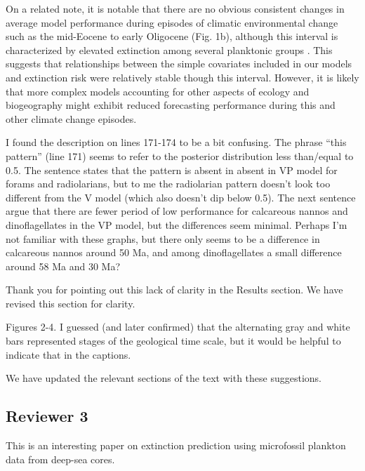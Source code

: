 \documentclass[12pt,letterpaper]{article}
\begin{document}
\begin{refsection}
On a related note, it is notable that there are no obvious consistent changes in average model performance during episodes of climatic environmental change such as the mid-Eocene to early Oligocene (Fig. 1b), although this interval is characterized by elevated extinction among several planktonic groups \citep{Prothero1994,Wade2008,Kamikuri2012}. This suggests that relationships between the simple covariates included in our models and extinction risk were relatively stable though this interval.  However, it is likely that more complex models accounting for other aspects of ecology and biogeography might exhibit reduced forecasting performance during this and other climate change episodes.

\begin{bfseries}
  I found the description on lines 171-174 to be a bit confusing. The phrase “this pattern” (line 171) seems to refer to the posterior distribution less than/equal to 0.5. The sentence states that the pattern is absent in absent in VP model for forams and radiolarians, but to me the radiolarian pattern doesn’t look too different from the V model (which also doesn’t dip below 0.5). The next sentence argue that there are fewer period of low performance for calcareous nannos and dinoflagellates in the VP model, but the differences seem minimal. Perhaps I’m not familiar with these graphs, but there only seems to be a difference in calcareous nannos around 50 Ma, and among dinoflagellates a small difference around 58 Ma and 30 Ma?
\end{bfseries}

Thank you for pointing out this lack of clarity in the Results section. We have revised this section for clarity.

\begin{bfseries}
  Figures 2-4. I guessed (and later confirmed) that the alternating gray and white bars represented stages of the geological time scale, but it would be helpful to indicate that in the captions.
\end{bfseries}

We have updated the relevant sections of the text with these suggestions.

\subsection{Reviewer 3}

\begin{bfseries}
  This is an interesting paper on extinction prediction using microfossil plankton data from deep-sea cores.


\end{bfseries}
\end{refsection}
\end{document}
